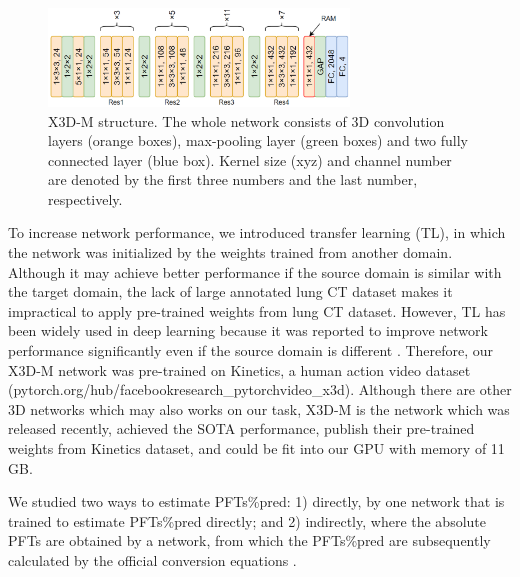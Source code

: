 \begin{figure}[tb]
    \centering
    \includegraphics[width=8cm]{x3d.png}
    \caption{X3D-M structure. The whole network consists of 3D convolution layers (orange boxes), max-pooling layer (green boxes) and two fully connected layer (blue box). Kernel size (xyz) and channel number are denoted by the first three numbers and the last number, respectively.}
    \label{fig:chap4_x3d}
\end{figure}

To increase network performance, we introduced transfer learning (TL), in which the network was initialized by the weights trained from another domain. Although it may achieve better performance if the source domain is similar with the target domain, the lack of large annotated lung CT dataset makes it impractical to apply pre-trained weights from lung CT dataset. However, TL has been widely used in deep learning because it was reported to improve network performance significantly even if the source domain is different \cite{Cheplygina2019}. Therefore, our X3D-M network was pre-trained on Kinetics, a human action video dataset \cite{Feichtenhofer, Kay} (pytorch.org/hub/facebookresearch\_pytorchvideo\_x3d). Although there are other 3D networks which may also works on our task, X3D-M is the network which was released recently, achieved the SOTA performance, publish their pre-trained weights from Kinetics dataset, and could be fit into our GPU with memory of 11 GB.

We studied two ways to estimate PFTs\%pred: 1) directly, by one network that is trained to estimate PFTs\%pred directly; and 2) indirectly, where the absolute PFTs are obtained by a network, from which the PFTs\%pred are subsequently calculated by the official conversion equations \cite{Hall2021, Stanojevic2017, Quanjer2012}.


